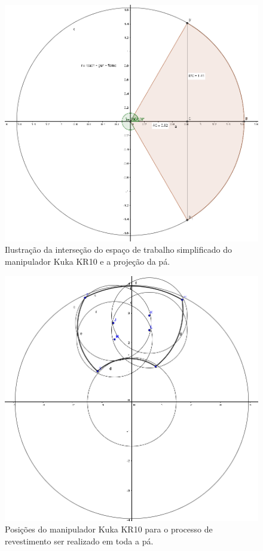\begin{figure}[h!]	
	\includegraphics[width=\columnwidth]{detail/figs/bighatch/kukageom.jpg}
	\caption{Ilustração da interseção do espaço de trabalho simplificado do
	manipulador Kuka KR10 e a projeção da pá.}
	\label{fig::kukageom}
\end{figure}

\begin{figure}[h!]	
	\includegraphics[width=\columnwidth]{detail/figs/bighatch/kukacircles.png}
	\caption{Posições do manipulador Kuka KR10 para o processo de
	revestimento ser realizado em toda a pá.}
	\label{fig::kukacircles}
\end{figure}


